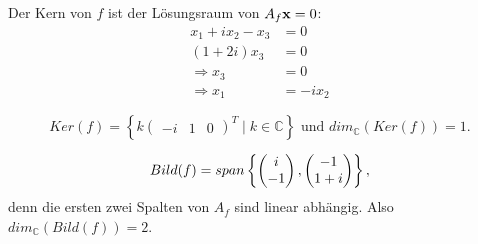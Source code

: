\documentclass{../mfa}
\begin{document}
Der Kern von $f$ ist der Lösungsraum von $A_f\mathbf{x} = 0$:
\begin{align*}
   x_1 + ix_2 -x_3 & = 0     \\
   (1+2i)x_3       & = 0     \\
   \Rightarrow x_3 & = 0     \\
   \Rightarrow x_1 & = -ix_2
\end{align*}

\begin{equation*}
   Ker(f) = \left\{k \begin{pmatrix}-i & 1 & 0\end{pmatrix}^T \mid k \in
\mathbb{C} \right\} \text{ und } dim_\mathbb{C}(Ker(f)) = 1.
\end{equation*}

\begin{equation*}
   Bild(f) = span\left\{\begin{pmatrix}i \\ -1\end{pmatrix}, \begin{pmatrix}-1 \\
   1+i\end{pmatrix}\right\},
\end{equation*}
denn die ersten zwei Spalten von $A_f$ sind linear abhängig.
Also $dim_\mathbb{C}(Bild(f)) = 2$.
\end{document}
